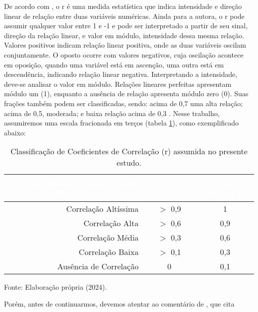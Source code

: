 \documentclass[
	12pt,				%
	openright,			%
	oneside,			%
	a4paper,			%
	english,			%
	french,				%
	spanish,			%
	brazil				%
	dvipsnames, table]{abntex2}
\begin{document}
\indent De acordo com , o \acrfull{r} é uma medida estatística que indica intensidade e direção linear de relação entre duas variáveis numéricas. Ainda para a autora, o \acrlong{r} pode assumir qualquer valor entre 1 e -1 e pode ser interpretado a partir de seu sinal, direção da relação linear, e valor em módulo, intensidade dessa mesma relação.
Valores positivos indicam relação linear positiva, onde as duas variáveis oscilam conjuntamente. O oposto ocorre com valores negativos, cuja oscilação acontece em oposição, quando uma variável está em ascenção, uma outra está em descendência, indicando relação linear negativa. Interpretando a intensidade, deve-se analisar o valor em módulo. Relações lineares perfeitas apresentam módulo um (1), enquanto a ausência de relação apresenta módulo zero (0). Suas frações também podem ser classificadas, sendo: acima de 0,7 uma alta relação; acima de 0,5, moderada; e baixa relação acima de 0,3 \cite{StatsDummies}. Nesse trabalho, assumiremos uma escala fracionada em terços (tabela \ref{tab:class_corr}), como exemplificado abaixo:

\begin{table}[htbp]
    \begin{center}
    \caption{Classificação de Coeficientes de Correlação (r) assumida no presente estudo.}
    {
    \begin{tabular}{r|cc}
    \hline
    \toprule
    \rowcolor{darkgray} \textcolor{white}{Classificação de Intensidade (Valores em Módulo)} & \textcolor{white}{Limite Inferior} & \textcolor{white}{Limite Superior}\\
    \midrule
    Correlação Altíssima & $>$ 0,9 & 1\\
    Correlação Alta & $>$  0,6 & 0,9\\
    Correlação Média & $>$  0,3 & 0,6\\
    Correlação Baixa & $>$  0,1 & 0,3\\
    Ausência de Correlação & 0 & 0,1\\
    \bottomrule
    \end{tabular}}
    \label{tab:class_corr}
    \end{center}
    \small{Fonte: Elaboração própria (2024).}
\end{table}

\indent Porém, antes de continuarmos, devemos atentar ao comentário de , que cita 
\end{document}
